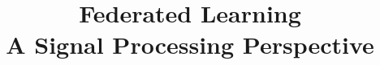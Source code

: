 \usepackage{nccmath}

\showtocfalse




\title[FL - Signal Processing Perspective]{Federated Learning \\ {\smaller[2] A Signal Processing Perspective}}
\date{}
\author[]{}




\setlength{\belowdisplayskip}{5pt} \setlength{\belowdisplayshortskip}{5pt}
\setlength{\abovedisplayskip}{5pt} \setlength{\abovedisplayshortskip}{5pt}


\begin{frame}
\titlepage %
\end{frame}


